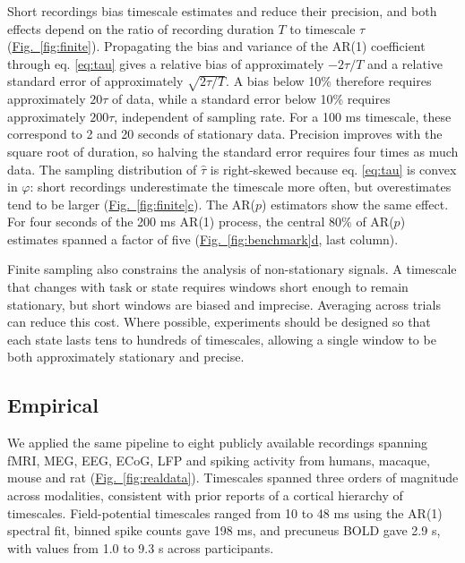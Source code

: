\documentclass[pdflatex,lineno,sn-nature]{sn-jnl}
\newcommand{\figpanel}[3][]{\hyperref[#2]{Fig.~#1\ref*{#2}#3}}
\theoremstyle{thmstyleone}
\theoremstyle{thmstyletwo}
\theoremstyle{thmstylethree}
\begin{document}
Short recordings bias timescale estimates and reduce their precision, and both effects depend on the ratio of recording duration $T$ to timescale $\tau$ (\figpanel{fig:finite}{}). Propagating the bias and variance of the AR(1) coefficient \cite{mann_statistical_1943, marriott_bias_1954} through eq. \ref{eq:tau} gives a relative bias of approximately $-2\tau/T$ and a relative standard error of approximately $\sqrt{2\tau/T}$. A bias below 10\% therefore requires approximately $20\tau$ of data, while a standard error below 10\% requires approximately $200\tau$, independent of sampling rate. For a 100 ms timescale, these correspond to 2 and 20 seconds of stationary data. Precision improves with the square root of duration, so halving the standard error requires four times as much data. The sampling distribution of $\hat\tau$ is right-skewed because eq. \ref{eq:tau} is convex in $\varphi$: short recordings underestimate the timescale more often, but overestimates tend to be larger (\figpanel{fig:finite}{c}). The AR($p$) estimators show the same effect. For four seconds of the 200 ms AR(1) process, the central 80\% of AR($p$) estimates spanned a factor of five (\figpanel{fig:benchmark}{d}, last column).

Finite sampling also constrains the analysis of non-stationary signals. A timescale that changes with task or state requires windows short enough to remain stationary, but short windows are biased and imprecise. Averaging across trials can reduce this cost. Where possible, experiments should be designed so that each state lasts tens to hundreds of timescales, allowing a single window to be both approximately stationary and precise.

\subsection{Empirical}\label{sec:realdata}

We applied the same pipeline to eight publicly available recordings spanning fMRI, MEG, EEG, ECoG, LFP and spiking activity from humans, macaque, mouse and rat (\figpanel{fig:realdata}{}). Timescales spanned three orders of magnitude across modalities, consistent with prior reports of a cortical hierarchy of timescales. Field-potential timescales ranged from 10 to 48 ms using the AR(1) spectral fit, binned spike counts gave 198 ms, and precuneus BOLD gave 2.9 s, with values from 1.0 to 9.3 s across participants.
\end{document}
